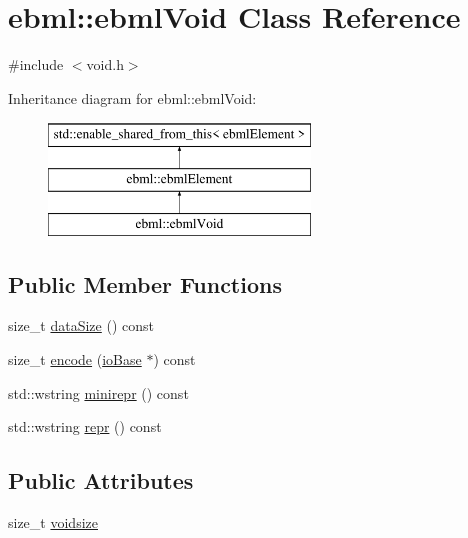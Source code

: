 \hypertarget{classebml_1_1ebmlVoid}{}\section{ebml\+:\+:ebml\+Void Class Reference}
\label{classebml_1_1ebmlVoid}


{\ttfamily \#include $<$void.\+h$>$}

Inheritance diagram for ebml\+:\+:ebml\+Void\+:\begin{figure}[H]
\begin{center}
\leavevmode
\includegraphics[height=3.000000cm]{classebml_1_1ebmlVoid}
\end{center}
\end{figure}
\subsection*{Public Member Functions}
\begin{DoxyCompactItemize}
\item 
size\+\_\+t \mbox{\hyperlink{classebml_1_1ebmlVoid_a9801f10eb9f0a5449fa39d8a31dbf315}{data\+Size}} () const
\item 
size\+\_\+t \mbox{\hyperlink{classebml_1_1ebmlVoid_ac822d7bf461ef44812596a34cccb134a}{encode}} (\mbox{\hyperlink{classebml_1_1ioBase}{io\+Base}} $\ast$) const
\item 
std\+::wstring \mbox{\hyperlink{classebml_1_1ebmlVoid_ad9baeb00b771d3ae4cdebb2078f863ad}{minirepr}} () const
\item 
std\+::wstring \mbox{\hyperlink{classebml_1_1ebmlVoid_a54f5a77bc4029d77d0a456fa8dcb53ef}{repr}} () const
\end{DoxyCompactItemize}
\subsection*{Public Attributes}
\begin{DoxyCompactItemize}
\item 
size\+\_\+t \mbox{\hyperlink{classebml_1_1ebmlVoid_a62a54e4b5ef5acf454f0240db8ee6c90}{voidsize}}
\end{DoxyCompactItemize}
